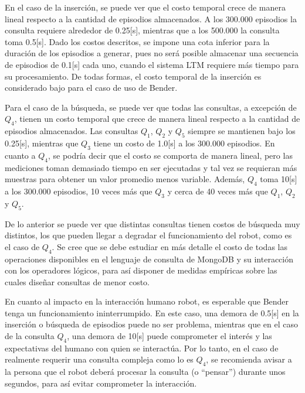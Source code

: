 En el caso de la inserción, se puede ver que el costo temporal crece de manera lineal respecto a la cantidad de episodios almacenados. A los 300.000 episodios la consulta requiere alrededor de 0.25[s], mientras que a los 500.000 la consulta toma 0.5[s]. Dado los costos descritos, se impone una cota inferior para la duración de los episodios a generar, pues no será posible almacenar una secuencia de episodios de 0.1[s] cada uno, cuando el sistema LTM requiere más tiempo para su procesamiento. De todas formas, el costo temporal de la inserción es considerado bajo para el caso de uso de Bender.


Para el caso de la búsqueda, se puede ver que todas las consultas, a excepción de $Q_4$, tienen un costo temporal que crece de manera lineal  respecto a la cantidad de episodios almacenados. Las consultas $Q_1$, $Q_2$ y $Q_5$ siempre se mantienen bajo los 0.25[s], mientras que $Q_3$ tiene un costo de 1.0[s] a los 300.000 episodios. En cuanto a $Q_4$, se podría decir que el costo se comporta de manera lineal, pero las mediciones toman demasiado tiempo en ser ejecutadas y tal vez se requieran más muestras para obtener un valor promedio menos variable. Además, $Q_4$ toma 10[s] a los 300.000 episodios, 10 veces más que $Q_3$ y cerca de 40 veces más que $Q_1$, $Q_2$ y $Q_5$.

De lo anterior se puede ver que distintas consultas tienen costos de búsqueda muy  distintos, los que pueden llegar a degradar el funcionamiento del robot, como es el caso de $Q_4$.  Se cree que se debe estudiar en más detalle el costo de todas las operaciones disponibles en el lenguaje de consulta de MongoDB y su interacción con los operadores lógicos, para así disponer de medidas empíricas sobre las cuales diseñar consultas de menor costo.

En cuanto al impacto en la interacción humano robot, es esperable que Bender tenga un funcionamiento ininterrumpido. En este caso, una demora de 0.5[s] en la inserción o búsqueda de episodios puede no ser problema, mientras que en el caso de la consulta $Q_4$, una demora de 10[s] puede comprometer el interés y las expectativas del humano con quien se interactúa. Por lo tanto, en el caso de realmente requerir una consulta compleja como lo es $Q_4$, se recomienda avisar a la persona que el robot deberá procesar la consulta (o ``pensar'') durante unos segundos, para así evitar comprometer la interacción.

